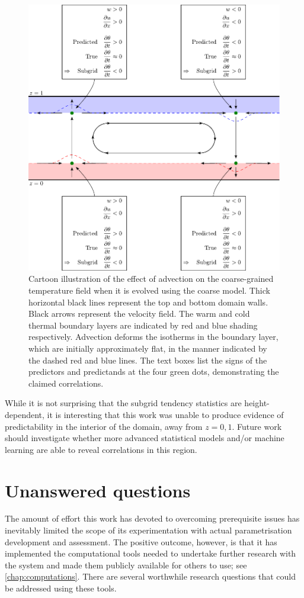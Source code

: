 \documentclass[../main.tex]{subfiles}
\begin{document}
\begin{figure}[ht]
    \centering
    \includegraphics[width=0.8\linewidth]{figures/tendency_explanation.pdf}
    \caption{
        Cartoon illustration of the effect of advection on the coarse-grained
        temperature field when it is evolved using the coarse model. Thick
        horizontal black lines represent the top and bottom domain walls. Black
        arrows represent the velocity field. The warm and cold thermal boundary
        layers are indicated by red and blue shading respectively. Advection
        deforms the isotherms in the boundary layer, which are initially
        approximately flat, in the manner indicated by the dashed red and blue
        lines. The text boxes list the signs of the predictors and predictands
        at the four green dots, demonstrating the claimed correlations.
    }
    \label{fig:tendency_explanation}
\end{figure}

While it is not surprising that the subgrid tendency statistics are
height-dependent, it is interesting that this work was unable to produce
evidence of predictability in the interior of the domain, away from $z=0,1$.
Future work should investigate whether more advanced statistical models and/or
machine learning are able to reveal correlations in this region.


\section{Unanswered questions}
\label{sec:conclusion_unanswered_questions}
The amount of effort this work has devoted to overcoming prerequisite issues
has inevitably limited the scope of its experimentation with actual
parametrisation development and assessment. The positive outcome, however, is
that it has implemented the computational tools needed to undertake further
research with the \rb{} system and made them publicly available for others to
use; see \cref{chap:computations}. There are several worthwhile research
questions that could be addressed using these tools.
\end{document}
